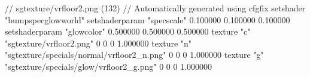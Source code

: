 // sgtexture/vrfloor2.png (132)
// Automatically generated using cfgfix
setshader "bumpspecglowworld"
setshaderparam "specscale" 0.100000 0.100000 0.100000
setshaderparam "glowcolor" 0.500000 0.500000 0.500000
texture "c" "sgtexture/vrfloor2.png" 0 0 0 1.000000
texture "n" "sgtexture/specials/normal/vrfloor2_n.png" 0 0 0 1.000000
texture "g" "sgtexture/specials/glow/vrfloor2_g.png" 0 0 0 1.000000
